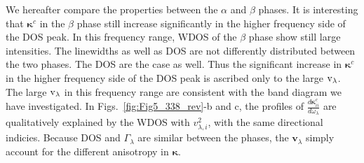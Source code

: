 \documentclass[twocolumn,amsmath,amssymb,a4paper,prb,superscriptaddress,floatfix]{revtex4-1}
\begin{document}
We hereafter compare the properties between the $\alpha$ and $\beta$ phases.  It
is interesting that $\boldsymbol{\kappa}^c$ in the $\beta$ phase still increase
significantly in the higher frequency side of the DOS peak. In this frequency
range, WDOS of the $\beta$ phase show still large intensities.  The linewidths
as well as DOS are not differently distributed between the two phases.  The DOS
are the case as well. Thus the significant increase in $\boldsymbol{\kappa}^c$
in the higher frequency side of the DOS peak is ascribed only to the large
$\rm{v}_\lambda$.  The large $\rm{v}_\lambda$ in this frequency range are
consistent with the band diagram we have investigated.  In
Figs.~\ref{fig:Fig5_338_rev}-b and c, the profiles of
$\frac{d\boldsymbol{\kappa}^c_{ii}}{d\omega_\lambda}$ are qualitatively
explained by the WDOS with $v_{\lambda,i}^2$, with the same directional
indicies. Because DOS and $\Gamma_{\lambda}$ are similar between the phases, the
$\mathbf{v}_\lambda$ simply account for the different anisotropy in
$\boldsymbol{\kappa}$. 
\end{document}
